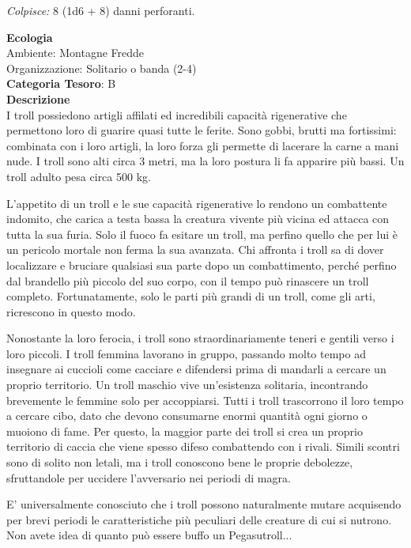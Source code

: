 \begin{multicols}{2}
{\emph{Colpisce:} 8 (1d6 + 8) danni perforanti.

\textbf{Ecologia}\\
Ambiente: Montagne Fredde\\
Organizzazione: Solitario o banda (2-4)\\
\textbf{Categoria Tesoro}: B\\
\textbf{Descrizione}\\
I troll possiedono artigli affilati ed incredibili capacità rigenerative che permettono loro di guarire quasi tutte le ferite. Sono gobbi, brutti ma fortissimi: combinata con i loro artigli, la loro forza gli permette di lacerare la carne a mani nude. I troll sono alti circa 3 metri, ma la loro postura li fa apparire più bassi. Un troll adulto pesa circa 500 kg.

L'appetito di un troll e le sue capacità rigenerative lo rendono un combattente indomito, che carica a testa bassa la creatura vivente più vicina ed attacca con tutta la sua furia. Solo il fuoco fa esitare un troll, ma perfino quello che per lui è un pericolo mortale non ferma la sua avanzata. Chi affronta i troll sa di dover localizzare e bruciare qualsiasi sua parte dopo un combattimento, perché perfino dal brandello più piccolo del suo corpo, con il tempo può rinascere un troll completo. Fortunatamente, solo le parti più grandi di un troll, come gli arti, ricrescono in questo modo.

Nonostante la loro ferocia, i troll sono straordinariamente teneri e gentili verso i loro piccoli. I troll femmina lavorano in gruppo, passando molto tempo ad insegnare ai cuccioli come cacciare e difendersi prima di mandarli a cercare un proprio territorio. Un troll maschio vive un'esistenza solitaria, incontrando brevemente le femmine solo per accoppiarsi. Tutti i troll trascorrono il loro tempo a cercare cibo, dato che devono consumarne enormi quantità ogni giorno o muoiono di fame. Per questo, la maggior parte dei troll si crea un proprio territorio di caccia che viene spesso difeso combattendo con i rivali. Simili scontri sono di solito non letali, ma i troll conoscono bene le proprie debolezze, sfruttandole per uccidere l'avversario nei periodi di magra.

E' universalmente conosciuto che i troll possono naturalmente mutare acquisendo per brevi periodi le caratteristiche più peculiari delle creature di cui si nutrono. Non avete idea di quanto può essere buffo un Pegasutroll...


}
\end{multicols}
